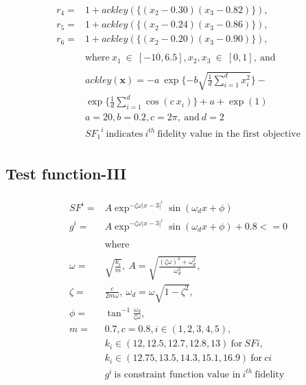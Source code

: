 {\begin{align}
\begin{split}
			r_4 ={} &1 + ackley(\{(x_2 - 0.30) (x_3 - 0.82)\}),\\
			r_5 ={} &1 + ackley(\{(x_2 - 0.24) (x_3 - 0.86)\}),\\ 
			r_6 ={} &1 + ackley(\{(x_2 - 0.20) (x_3 - 0.90)\}),\\ \\
			& \text{where}~x_1~\in~[-10,6.5], x_2, x_3~\in~[0,1],~\text{and} \\\\
			&ackley(\mathbf{x}) = -a~\exp\{-b\sqrt{\frac{1}{d}\sum_{i = 1}^d x^2_i}\} -\\ 
			& \exp\{\frac{1}{d}\sum_{i = 1}^d \cos(c~x_i)\} + a + \exp(1) \\
			& a = 20, b = 0.2, c = 2\pi,~\text{and}~d = 2\\
			& {SF_1}^i~\text{indicates}~i^{th}~\text{fidelity value in the first objective}
			\label{eq:testfunc2}
		\end{split}
\end{align}}%

\subsection{Test function-III}
{\small
	\begin{align}
		\begin{split} 
			SF^i ={} & A\exp^{-\zeta\omega{|x-3|}^i}\sin(\omega_dx+\phi) \\
			g^i = {} & A\exp^{-\zeta\omega{|x-3|}^i}\sin(\omega_dx+\phi) + 0.8 <= 0 \\\\
			&\text{where}\\ \\
			\omega ={} &\sqrt{\frac{k_i}{m}},~A = \sqrt{\frac{(\zeta\omega)^2 + \omega^2_d}{\omega^2_d}},\\
			\zeta ={} &\frac{c}{2m\omega},~\omega_d = \omega\sqrt{1-\zeta^2},\\
			\phi ={} &\tan^{-1}\frac{\omega_d}{\zeta\omega},\\
			m ={} & 0.7, c = 0.8, i \in (1,2,3,4,5), \\
			&k_i \in (12,12.5,12.7,12.8,13)~\text{for}~SFi,\\
			&k_i \in (12.75,13.5,14.3,15.1,16.9)~\text{for}~ci\\
			&g^i~\text{is constraint function value in}~i^{th}~\text{fidelity}
			\label{eq:testfunc3}
		\end{split}
\end{align}}%

